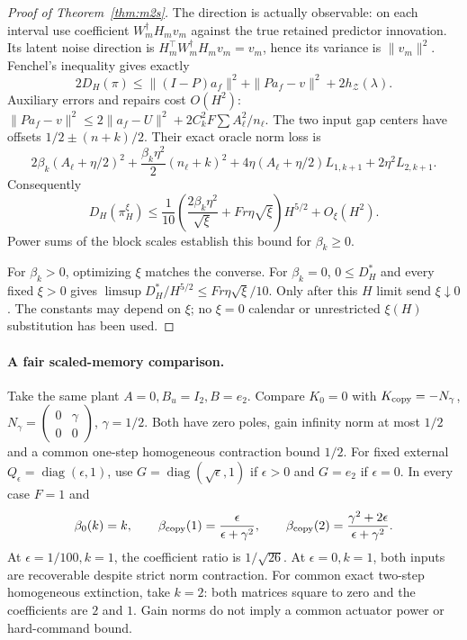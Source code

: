 \documentclass[11pt]{article}
\begin{document}
\begin{proof}[Proof of Theorem~\ref{thm:m2s}]
The direction is actually observable: on each interval use coefficient
$W_m^\dagger H_mv_m$ against the true retained predictor innovation.
Its latent noise direction is $H_m^\top W_m^\dagger H_mv_m=v_m$,
hence its variance is $\|v_m\|^2$.
Fenchel's inequality gives exactly
\[
2D_H(\pi)\le\|(I-P)a_f\|^2+\|Pa_f-v\|^2+2h_{\mathcal Z}(\lambda).
\]
Auxiliary errors and repairs cost $O(H^2)$:
$\|Pa_f-v\|^2\le2\|a_f-U\|^2+2C_k^2F\sum A_\ell^2/n_\ell$.
The two input gap centers have offsets $1/2\pm(n+k)/2$.
Their exact oracle norm loss is
\[
2\beta_k(A_\ell+\eta/2)^2+\frac{\beta_k\eta^2}{2}(n_\ell+k)^2
+4\eta(A_\ell+\eta/2)L_{1,k+1}+2\eta^2L_{2,k+1}.
\]
Consequently
\begin{equation}\label{eq:upper}
D_H(\pi_H^\xi)\le\frac1{10}
\left(\frac{2\beta_k\eta^2}{\sqrt\xi}+Fr\eta\sqrt\xi\right)H^{5/2}
+O_\xi(H^2).
\end{equation}
Power sums of the block scales establish this bound for $\beta_k\ge0$.

For $\beta_k>0$, optimizing $\xi$ matches the converse.
For $\beta_k=0$, $0\le D_H^*$ and every fixed $\xi>0$ gives
$\limsup D_H^*/H^{5/2}\le Fr\eta\sqrt\xi/10$.
Only after this $H$ limit send $\xi\downarrow0$.
The constants may depend on $\xi$; no $\xi=0$ calendar or unrestricted
$\xi(H)$ substitution has been used.
\end{proof}

\paragraph{A fair scaled-memory comparison.}
Take the same plant $A=0,B_u=I_2,B=e_2$.
Compare $K_0=0$ with
$K_{\rm copy}=-N_\gamma$,
$N_\gamma=\left(\begin{smallmatrix}0&\gamma\\0&0\end{smallmatrix}\right)$,
$\gamma=1/2$.
Both have zero poles, gain infinity norm at most $1/2$ and a common
one-step homogeneous contraction bound $1/2$.
For fixed external $Q_\epsilon=\operatorname{diag}(\epsilon,1)$,
use $G=\operatorname{diag}(\sqrt\epsilon,1)$ if $\epsilon>0$ and $G=e_2$ if
$\epsilon=0$. In every case $F=1$ and
\[
\beta_0(k)=k,\qquad
\beta_{\rm copy}(1)=\frac{\epsilon}{\epsilon+\gamma^2},\qquad
\beta_{\rm copy}(2)=\frac{\gamma^2+2\epsilon}{\epsilon+\gamma^2}.
\]
At $\epsilon=1/100,k=1$, the coefficient ratio is $1/\sqrt{26}$.
At $\epsilon=0,k=1$, both inputs are recoverable despite strict norm contraction.
For common exact two-step homogeneous extinction, take $k=2$:
both matrices square to zero and the coefficients are $2$ and $1$.
Gain norms do not imply a common actuator power or hard-command bound.
\end{document}
